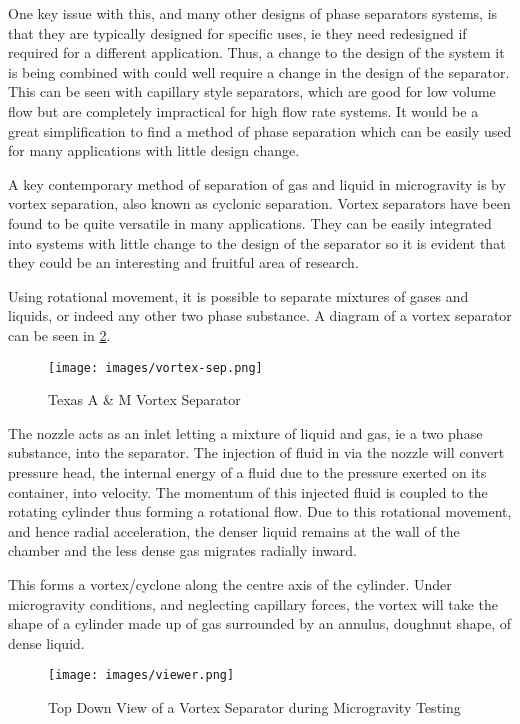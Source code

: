 \documentclass[12pt]{article}
\begin{document}
One key issue with this, and many other designs of phase separators systems, is that they are typically designed for specific uses, ie they need redesigned if required for a different application. Thus, a change to the design of the system it is being combined with could well require a change in the design of the separator. This can be seen with capillary style separators, which are good for low volume flow but are completely impractical for high flow rate systems. It would be a great simplification to find a method of phase separation which can be easily used for many applications with little design change.

A key contemporary method of separation of gas and liquid in microgravity is by vortex separation, also known as cyclonic separation. Vortex separators have been found to be quite versatile in many applications. They can be easily integrated into systems with little change to the design of the separator so it is evident that they could be an interesting and fruitful area of research.\cite{bean2002vortex}

Using rotational movement, it is possible to separate mixtures of gases and liquids, or indeed any other two phase substance. A diagram of a vortex separator can be seen in \cref{fig:vortex}.

\begin{figure}[ht]
\centering
\texttt{[image: images/vortex-sep.png]}
\caption{Texas A \& M Vortex Separator}
\label{fig:vortex}
\end{figure}

The nozzle acts as an inlet letting a mixture of liquid and gas, ie a two phase substance, into the separator. The injection of fluid in via the nozzle will convert pressure head, the internal energy of a fluid due to the pressure exerted on its container, into velocity. The momentum of this injected fluid is coupled to the rotating cylinder thus forming a rotational flow. Due to this rotational movement, and hence radial acceleration, the denser liquid remains at the wall of the chamber and the less dense gas migrates radially inward.\cite{hawkes1998ultrasonic} 

This forms a vortex/cyclone along the centre axis of the cylinder. Under microgravity conditions, and neglecting capillary forces, the vortex will take the shape of a cylinder made up of gas surrounded by an annulus, doughnut shape, of dense liquid.
\begin{figure}[ht]
\centering
\texttt{[image: images/viewer.png]}
\label{fig:vortex}
\caption{Top Down View of a Vortex Separator during Microgravity Testing}
\end{figure}
\end{document}
